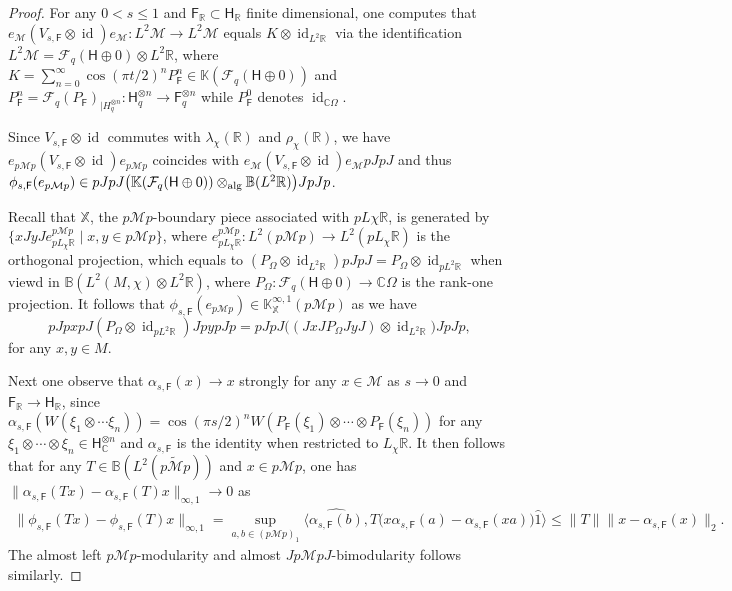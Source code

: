 \documentclass[a4paper,11pt]{amsart}
\theoremstyle{definition}
\newcommand{\B}{{\mathbb B}}
\newcommand{\C}{{\mathbb C}}
\newcommand{\K}{{\mathbb K}}
\newcommand{\R}{{\mathbb R}}
\newcommand{\X}{{\mathbb X}}
\newcommand{\cF}{{\mathcal F}}
\newcommand{\cM}{{\mathcal M}}
\newcommand{\sH}{\mathsf{H}}
\newcommand{\sF}{\mathsf{F}}
\newcommand{\id}{\operatorname{id}}
\newcommand{\ot}{\otimes}
\begin{document}
\begin{proof}
For any $0<s\leq 1$ and $\sF_\R\subset \sH_\R$ finite dimensional,
	one computes that
	$e_{\cM} (V_{s,\sF}\ot \id) e_\cM: L^2\cM\to L^2\cM$
	equals $K\ot \id_{L^2\R}$ via the identification $L^2\cM=\cF_q(\sH\oplus 0)\ot L^2\R$,
	where $K=\sum_{n=0}^\infty \cos(\pi t/2)^n P_\sF^n\in \K(\cF_q(\sH\oplus 0))$
	and $P_\sF^n=\cF_q(P_\sF)_{\mid H^{\ot n}_q}: \sH^{\ot n}_q\to \sF^{\ot n}_q$ while $P_\sF^0$ denotes $\id_{\C\Omega}$.
	
Since $V_{s,\sF}\ot \id$ commutes with $\lambda_{\chi}(\R)$ and $\rho_{\chi}(\R)$, we have
	$e_{p\cM p} (V_{s,\sF}\ot \id) e_{p\cM p}$
	coincides with $e_\cM(V_{s,\sF}\ot \id) e_{\cM} p JpJ$ and thus $\phi_{s,\sF}(e_{p\cM p})\in p JpJ \big(\K(\cF_q(\sH\oplus 0))\ot_{\rm alg} \B(L^2\R)\big)JpJp$.
	
Recall that $\X$, the $p\cM p$-boundary piece associated with $pL\chi\R$, is generated by $\{xJyJe_{pL_{\chi}\R}^{p\cM p} \mid x,y\in p\cM p\}$,
	where $e_{pL_\chi\R}^{p\cM p}: L^2(p\cM p)\to L^2(pL_\chi\R)$ is the orthogonal projection,
	which equals to $(P_{\Omega}\ot \id_{L^2\R})pJpJ=P_\Omega\ot \id_{pL^2\R}$ when viewd in $\B(L^2(M,\chi)\ot L^2\R)$,
	where $P_\Omega: \cF_q(\sH\oplus 0)\to \C\Omega$ is the rank-one projection.
It follows that $\phi_{s,\sF}(e_{p\cM p})\in \K_{\X}^{\infty,1}(p\cM p)$
	as we have
	$$
	pJpxpJ (P_{\Omega}\ot \id_{pL^2\R}) JpypJp=pJpJ \big((JxJP_\Omega JyJ)\ot \id_{L^2\R} \big)JpJ p,
	$$
	for any $x,y\in M$.
	
Next one observe that $\alpha_{s,\sF}(x)\to x$ strongly for any $x\in \cM$ as $s\to 0$ and $\sF_\R \to \sH_\R$,
	since $\alpha_{s,\sF}(W(\xi_1\ot \cdots \xi_n))=\cos(\pi s/2)^n W(P_\sF(\xi_1)\ot \cdots \ot P_\sF(\xi_n))$
	for any $\xi_1\ot \cdots \ot \xi_n\in \sH_\C^{\ot n}$
	and $\alpha_{s,\sF}$ is the identity when restricted to $L_\chi\R$.
It then follows that for any $T\in \B(L^2(p\tilde \cM p))$ and $x\in p\cM p$,
	one has $\|\alpha_{s,\sF}(Tx)-\alpha_{s,\sF}(T)x\|_{\infty,1}\to 0$ as
\[\begin{aligned}
\|\phi_{s, \sF}(Tx)-\phi_{s,\sF}(T)x\|_{\infty,1}=\sup_{a,b\in (p\cM p)_1} \langle \widehat{ \alpha_{s,\sF}( b)}, T\big(x \alpha_{s,\sF}(a)-\alpha_{s,\sF}(xa)\big) \hat 1\rangle\leq \|T\| \|x-\alpha_{s,\sF}(x)\|_2.
\end{aligned}\]
The almost left $p\cM p$-modularity and almost $J p\cM p J$-bimodularity follows similarly. 
\end{proof}
\end{document}
